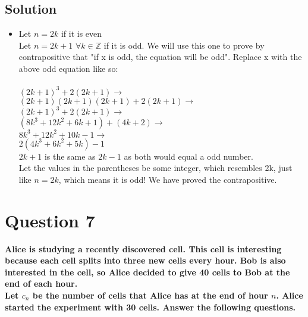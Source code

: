 \documentclass[11pt]{article}
\begin{document}
    \subsection*{Solution}
    \begin{itemize}
        \item[] Let \(n = 2k\) if it is even \\
        Let \(n= 2k+1\) \(\forall k \in \mathbb{Z}\) if it is odd. We will use this one to prove by contrapositive that "if x is odd, the equation will be odd". 
        Replace x with the above odd equation like so: \\ \\\((2k+1)^3+2(2k+1) \rightarrow \) \\
        \((2k+1)(2k+1)(2k+1)+2(2k+1) \rightarrow \) \\
        \((2k+1)^3+2(2k+1) \rightarrow \) \\
        \((8k^3+12k^2+6k+1) + (4k+2) \rightarrow\) \\
        \(8k^3+12k^2+10k-1 \rightarrow\) \\
        \(2(4k^3+6k^2+5k) - 1 \) \\

        \(2k+1\) is the same as \(2k-1\) as both would equal a odd number. \\
        
        Let the values in the parentheses be some integer, which resembles 2k, just like \(n=2k\), which means it is odd! We have proved the contrapositive.
    \end{itemize}

\clearpage
\section*{Question 7}
    \textbf{Alice is studying a recently discovered cell. This cell is interesting because each cell splits into three new cells every hour. Bob is also interested in the cell, so Alice decided to give 40 cells to Bob at the end of each hour. \\
    Let \(c_{n}\) be the number of cells that Alice has at the end of hour \(n\). Alice started the experiment with 30 cells. Answer the following questions.}
\end{document}
